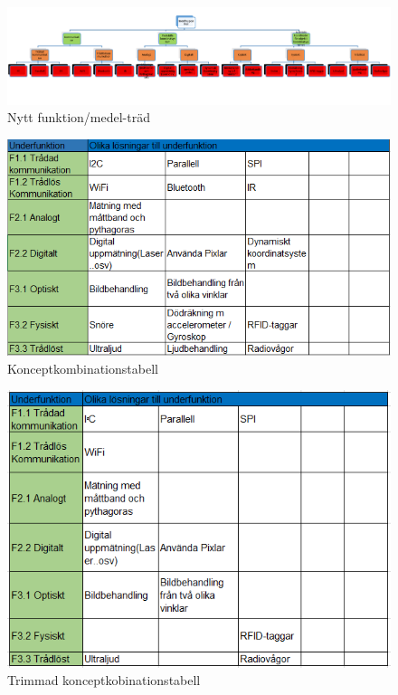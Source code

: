 \documentclass[11pt, a4paper]{report}
\begin{document}
\begin{figure}[H]
	\begin{center}
		\includegraphics [width=12cm,angle=0]{funktionmedel2.PNG}
		\caption{Nytt funktion/medel-träd}
		\label{fig:funktionmedel2}
	\end{center}
\end{figure}

\begin{figure}[H]
	\begin{center}
		\includegraphics [width=12cm,angle=0]{konceptkombtabell.PNG}
		\caption{Konceptkombinationstabell}
		\label{fig:koncepttabell1}
	\end{center}
\end{figure}


\begin{figure}[H]
	\begin{center}
		\includegraphics [width=12cm,angle=0]{trimmadtabell.PNG}
		\caption{Trimmad konceptkobinationstabell }
		\label{fig:koncepttabell2}
	\end{center}
\end{figure}
\end{document}
